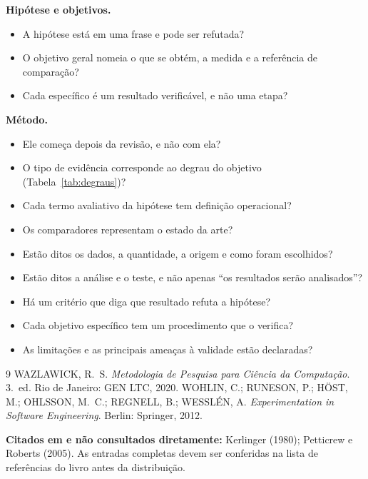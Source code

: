 \documentclass[10pt,a4paper]{extarticle}
\theoremstyle{definition}
\begin{document}
\begin{keybox}
\textbf{Hipótese e objetivos.}
\begin{itemize}
  \item A hipótese está em uma frase e pode ser refutada?
  \item O objetivo geral nomeia o que se obtém, a medida e a referência de comparação?
  \item Cada específico é um resultado verificável, e não uma etapa?
\end{itemize}
\textbf{Método.}
\begin{itemize}
  \item Ele começa depois da revisão, e não com ela?
  \item O tipo de evidência corresponde ao degrau do objetivo (Tabela~\ref{tab:degraus})?
  \item Cada termo avaliativo da hipótese tem definição operacional?
  \item Os comparadores representam o estado da arte?
  \item Estão ditos os dados, a quantidade, a origem e como foram escolhidos?
  \item Estão ditos a análise e o teste, e não apenas \enquote{os resultados serão analisados}?
  \item Há um critério que diga que resultado refuta a hipótese?
  \item Cada objetivo específico tem um procedimento que o verifica?
  \item As limitações e as principais ameaças à validade estão declaradas?
\end{itemize}
\end{keybox}

\begin{thebibliography}{9}
 WAZLAWICK, R.\ S. \emph{Metodologia de Pesquisa para Ciência da Computação}. 3.\ ed. Rio de Janeiro: GEN LTC, 2020.
 WOHLIN, C.; RUNESON, P.; HÖST, M.; OHLSSON, M.\ C.; REGNELL, B.; WESSLÉN, A. \emph{Experimentation in Software Engineering}. Berlin: Springer, 2012.
\end{thebibliography}

\textbf{Citados em \cite{wazlawick2020} e não consultados diretamente:} Kerlinger (1980); Petticrew e Roberts (2005). As entradas completas devem ser conferidas na lista de referências do livro antes da distribuição.
\end{document}
